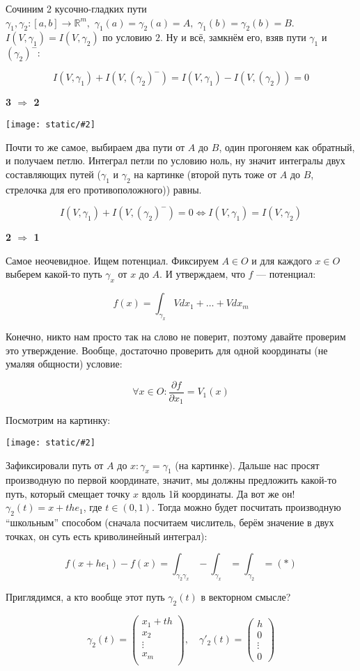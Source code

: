 \documentclass{article}
\def\dbl{\,\,}
\def\images#1#2{\begin{center}\texttt{[image: static/\#2]}\end{center}}
\begin{document}
Сочиним 2 кусочно-гладких пути $\gamma_1, \gamma_2: [a, b] \rightarrow \mathbb{R}^m, \dbl \gamma_1(a) = \gamma_2(a) = A, \dbl \gamma_1(b) = \gamma_2(b) = B$. $I(V, \gamma_1) = I(V, \gamma_2)$ по условию $2$. Ну и всё, замкнём его, взяв пути $\gamma_1$ и $(\gamma_2)^-$:

\[I(V, \gamma_1) + I(V, (\gamma_2)^-) = I(V, \gamma_1) - I(V, (\gamma_2)) = 0\]

\textbf{3 $\Rightarrow$ 2}

\images{0.3}{harakt_pot_vp_1.jpg}

Почти то же самое, выбираем два пути от $A$ до $B$, один прогоняем как обратный, и получаем петлю. Интеграл петли по условию ноль, ну значит интегралы двух составляющих путей ($\gamma_1$ и $\gamma_2$ на картинке (второй путь тоже от $A$ до $B$, стрелочка для его противоположного)) равны.

\[I(V, \gamma_1) + I(V, (\gamma_2)^-) = 0 \Leftrightarrow I(V, \gamma_1) = I(V, \gamma_2)\]

\textbf{2 $\Rightarrow$ 1}

Самое неочевидное. Ищем потенциал. Фиксируем $A \in O$ и для каждого $x \in O$ выберем какой-то путь $\gamma_x$ от $x$ до $A$. И утверждаем, что $f$ --- потенциал:

\[f(x) = \int_{\gamma_x} Vdx_1 + \ldots + Vdx_m\]

Конечно, никто нам просто так на слово не поверит, поэтому давайте проверим это утверждение. Вообще, достаточно проверить для одной координаты (не умаляя общности) условие:

\[\forall x \in O : \frac{\partial f}{\partial x_1} = V_1(x)\]

Посмотрим на картинку:

\images{0.5}{harakt_pot_vp_2.jpg}

Зафиксировали путь от $A$ до $x: \gamma_x = \gamma_1$ (на картинке). Дальше нас просят производную по первой координате, значит, мы должны предложить какой-то путь, который смещает точку $x$ вдоль 1й координаты. Да вот же он! $\gamma_2(t) = x + the_1$, где $t \in (0, 1)$. Тогда можно будет посчитать производную ``школьным'' способом (сначала посчитаем числитель, берём значение в двух точках, он суть есть криволинейный интеграл):

\[f(x + he_1) - f(x) = \int_{\gamma_2\gamma_x} - \int_{\gamma_x} = \int_{\gamma_2} = (*)\]

Приглядимся, а кто вообще этот путь $\gamma_2(t)$ в векторном смысле?

\[\gamma_2(t) = \begin{pmatrix}
    x_1 + th\\
    x_2\\
    \vdots \\
    x_m\\
\end{pmatrix}, \quad \gamma'_2(t) = \begin{pmatrix}
    h\\
    0\\
    \vdots\\
    0
\end{pmatrix}\]
\end{document}
